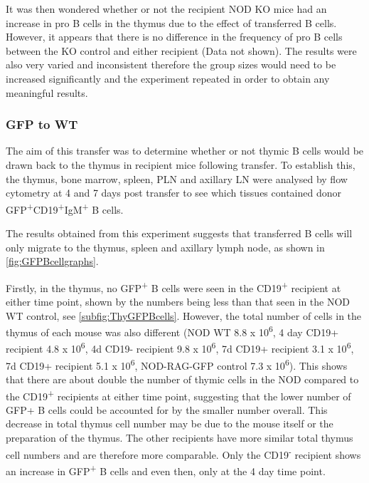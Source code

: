 It was then wondered whether or not the recipient NOD KO mice had an increase in pro B cells in the thymus due to the effect of transferred B cells.
However, it appears that there is no difference in the frequency of pro B cells between the KO control and either recipient (Data not shown).
The results were also very varied and inconsistent therefore the group sizes would need to be increased significantly and the experiment repeated in order to obtain any meaningful results.


\subsubsection{GFP to WT}

The aim of this transfer was to determine whether or not thymic B cells would be drawn back to the thymus in recipient mice following transfer.
To establish this, the thymus, bone marrow, spleen, PLN and axillary LN were analysed by flow cytometry at 4 and 7 days post transfer to see which tissues contained donor GFP\textsuperscript{+}CD19\textsuperscript{+}IgM\textsuperscript{+} B cells.






The results obtained from this experiment suggests that transferred B cells will only migrate to the thymus, spleen and axillary lymph node, as shown in \cref{fig:GFPBcellgraphs}.

Firstly, in the thymus, no GFP\textsuperscript{+} B cells were seen in the CD19\textsuperscript{+} recipient at either time point, shown by the numbers being less than that seen in the NOD WT control, see \cref{subfig:ThyGFPBcells}.
However, the total number of cells in the thymus of each mouse was also different (NOD WT 8.8 x 10\textsuperscript{6}, 4 day CD19+ recipient 4.8 x 10\textsuperscript{6}, 4d CD19- recipient 9.8 x 10\textsuperscript{6}, 7d CD19+ recipient 3.1 x 10\textsuperscript{6}, 7d CD19+ recipient 5.1 x 10\textsuperscript{6}, NOD-RAG-GFP control 7.3 x 10\textsuperscript{6}).
This shows that there are about double the number of thymic cells in the NOD compared to the CD19\textsuperscript{+} recipients at either time point, suggesting that the lower number of GFP+ B cells could be accounted for by the smaller number overall.
This decrease in total thymus cell number may be due to the mouse itself or the preparation of the thymus.
The other recipients have more similar total thymus cell numbers and are therefore more comparable.
Only the CD19\textsuperscript{-} recipient shows an increase in GFP\textsuperscript{+} B cells and even then, only at the 4 day time point.

